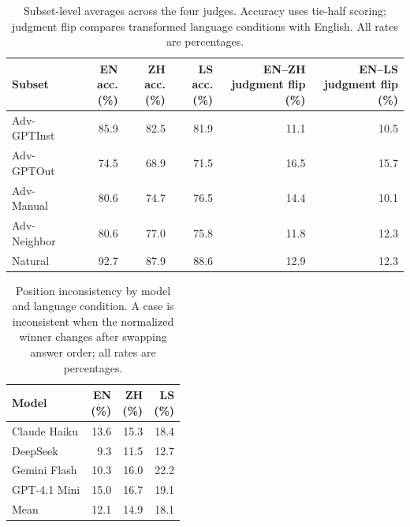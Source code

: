 \begin{table}[t]
\centering
\small
\setlength{\tabcolsep}{6pt}
\renewcommand{\arraystretch}{1.08}
\begin{tabular}{lrrrrr}
\hline
Subset & \shortstack{EN\\acc. (\%)} & \shortstack{ZH\\acc. (\%)} & \shortstack{LS\\acc. (\%)} & \shortstack{EN--ZH\\judgment flip (\%)} & \shortstack{EN--LS\\judgment flip (\%)} \\
\hline
Adv-GPTInst & 85.9 & 82.5 & 81.9 & 11.1 & 10.5 \\
Adv-GPTOut & 74.5 & 68.9 & 71.5 & 16.5 & 15.7 \\
Adv-Manual & 80.6 & 74.7 & 76.5 & 14.4 & 10.1 \\
Adv-Neighbor & 80.6 & 77.0 & 75.8 & 11.8 & 12.3 \\
Natural & 92.7 & 87.9 & 88.6 & 12.9 & 12.3 \\
\hline
\end{tabular}
\caption{Subset-level averages across the four judges. Accuracy uses tie-half scoring; judgment flip compares transformed language conditions with English. All rates are percentages.}
\label{tab:source-aggregate}
\end{table}

\begin{table}[t]
\centering
\small
\setlength{\tabcolsep}{4pt}
\renewcommand{\arraystretch}{1.08}
\begin{tabular}{lrrr}
\hline
Model & \shortstack{EN\\(\%)} & \shortstack{ZH\\(\%)} & \shortstack{LS\\(\%)} \\
\hline
Claude Haiku & 13.6 & 15.3 & 18.4 \\
DeepSeek & 9.3 & 11.5 & 12.7 \\
Gemini Flash & 10.3 & 16.0 & 22.2 \\
GPT-4.1 Mini & 15.0 & 16.7 & 19.1 \\
\hline
Mean & 12.1 & 14.9 & 18.1 \\
\hline
\end{tabular}
\caption{Position inconsistency by model and language condition. A case is inconsistent when the normalized winner changes after swapping answer order; all rates are percentages.}
\label{tab:position-extra}
\end{table}

